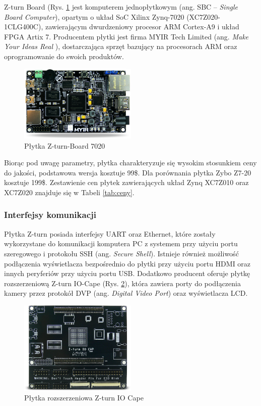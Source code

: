 Z-turn Board (Rys. \ref{zturn_board} jest komputerem jednopłytkowym 
(ang. SBC – \emph{Single Board Computer}), opartym o układ SoC Xilinx 
Zynq-7020 (XC7Z020-1CLG400C), zawierającym dwurdzeniowy procesor ARM Cortex-A9 
i układ FPGA Artix 7. Producentem płytki jest firma MYIR Tech Limited (ang. \emph{Make 
Your Ideas Real} ), dostarczająca sprzęt bazujący na procesorach ARM oraz 
oprogramowanie do swoich produktów\cite{myir}. 

\begin{figure}[h]
  \centering
  \includegraphics[width=0.5\textwidth]{img/zturn_board.jpg}
  \caption{Płytka Z-turn-Board 7020}
  \label{zturn_board}
\end{figure}

Biorąc pod uwagę parametry, płytka 
charakteryzuje się wysokim stosunkiem ceny do jakości, podstawowa wersja kosztuje
99\$. Dla porównania płytka Zybo Z7-20 kosztuje 199\$. Zestawienie cen płytek 
zawierających układ Zynq XC7Z010 oraz XC7Z020 znajduje się w Tabeli \ref{tab:ceny}. 

\subsubsection{Interfejsy komunikacji}

Płytka Z-turn posiada interfejsy UART oraz Ethernet, które zostały wykorzystane do komunikacji komputera PC z systemem przy użyciu portu szeregowego  
i protokołu SSH (ang. \emph{Secure Shell}). Istnieje również możliwość podłączenia wyświetlacza bezpośrednio do płytki przy użyciu portu HDMI oraz innych peryferiów przy użyciu portu USB. Dodatkowo producent oferuje płytkę rozszerzeniową Z-turn IO-Cape (Rys. \ref{iocape}), która zawiera porty do podłączenia kamery przez protokół DVP (ang. \emph{Digital Video Port}) oraz wyświetlacza LCD. 

\begin{figure}[h]
  \centering
  \includegraphics[width=0.5\textwidth]{img/iocape.png}
  \caption{Płytka rozszerzeniowa Z-turn IO Cape}
  \label{iocape}
\end{figure}

